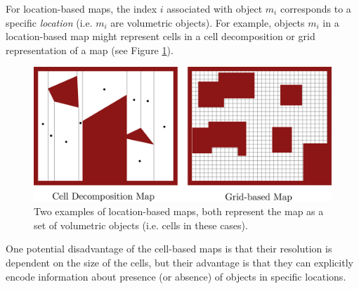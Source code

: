 For location-based maps, the index $i$ associated with object $m_i$ corresponds to a specific \textit{location} (i.e. $m_i$ are volumetric objects). For example, objects $m_i$ in a location-based map might represent cells in a cell decomposition or grid representation of a map (see Figure \ref{fig:LocationBasedMaps}).
\begin{figure}[ht]
\centering
\includegraphics[width=.75\linewidth]{tex/figs/ch16_figs/location_based_maps.png}
\caption{Two examples of location-based maps, both represent the map as a set of volumetric objects (i.e. cells in these cases).}
\label{fig:LocationBasedMaps}
\end{figure}
One potential disadvantage of the cell-based maps is that their resolution is dependent on the size of the cells, but their advantage is that they can explicitly encode information about presence (or absence) of objects in specific locations.


